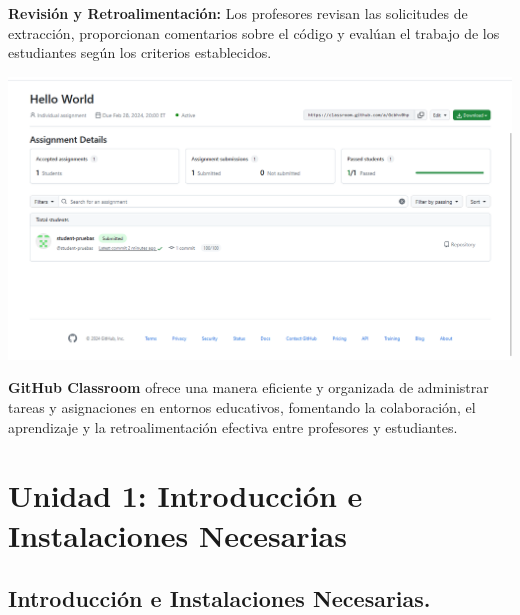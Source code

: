 \documentclass[
  a4paper,
  DIV=11,
  numbers=noendperiod,
  onepage,
  openany]{scrreprt}
\begin{document}
\textbf{Revisión y Retroalimentación:} Los profesores revisan las
solicitudes de extracción, proporcionan comentarios sobre el código y
evalúan el trabajo de los estudiantes según los criterios establecidos.

\begin{center}
\includegraphics{unidades/unidad0/images/paste-15.png}
\end{center}

\begin{tcolorbox}[enhanced jigsaw, bottomrule=.15mm, rightrule=.15mm, colframe=quarto-callout-tip-color-frame, arc=.35mm, breakable, colbacktitle=quarto-callout-tip-color!10!white, toptitle=1mm, colback=white, opacitybacktitle=0.6, opacityback=0, bottomtitle=1mm, toprule=.15mm, titlerule=0mm, left=2mm, coltitle=black, leftrule=.75mm, title=\textcolor{quarto-callout-tip-color}{\faLightbulb}\hspace{0.5em}{Tip}]

\textbf{GitHub Classroom} ofrece una manera eficiente y organizada de
administrar tareas y asignaciones en entornos educativos, fomentando la
colaboración, el aprendizaje y la retroalimentación efectiva entre
profesores y estudiantes.

\end{tcolorbox}

\part{Unidad 1: Introducción e Instalaciones Necesarias}

\chapter{Introducción e Instalaciones
Necesarias.}\label{introducciuxf3n-e-instalaciones-necesarias.}
\end{document}
